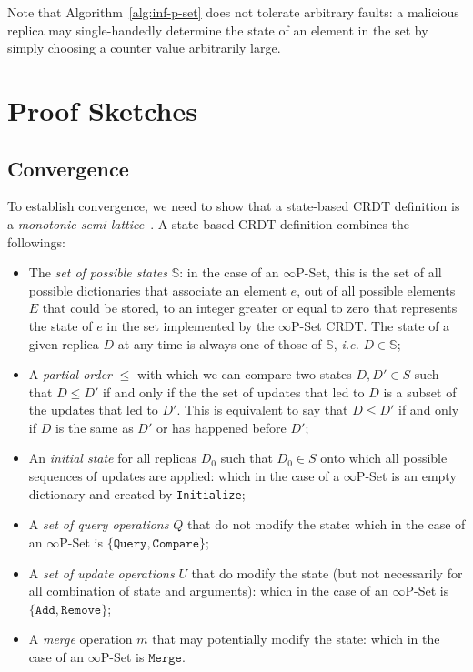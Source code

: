 \documentclass[11pt, oneside]{article}   	%
\begin{document}
Note that Algorithm~\ref{alg:inf-p-set} does not tolerate arbitrary faults: a malicious replica may single-handedly determine the state of an element in the set by simply choosing a counter value arbitrarily large.

\section{Proof Sketches}
\label{sec:proofs}

\subsection{Convergence}
\label{sec:proofs:convergence}

To establish convergence, we need to show that a state-based CRDT definition is a \textit{monotonic semi-lattice}~\cite{shapiro:hal-00932836}. A state-based CRDT definition combines the followings:
\begin{itemize}
	\item The \textit{set of possible states} $\mathds{S}$: in the case of an $\infty$P-Set, this is the set of all possible dictionaries that associate an element $e$, out of all possible elements $E$ that could be stored, to an integer greater or equal to zero that represents the state of $e$ in the set implemented by the $\infty$P-Set CRDT. The state of a given replica $D$ at any time is always one of those of $\mathds{S}$, \textit{i.e.} $D \in \mathds{S}$;
	\item A \textit{partial order} $\leq$ with which we can compare two states $D, D' \in S$ such that $D \leq D'$ if and only if the the set of updates that led to $D$ is a subset of the updates that led to $D'$. This is equivalent to say that $D \leq D'$ if and only if $D$ is the same as $D'$ or has happened before $D'$;
	\item An \textit{initial state} for all replicas $D_0$ such that $D_0 \in S$ onto which all possible sequences of updates are applied: which in the case of a $\infty$P-Set is an empty dictionary and created by \texttt{Initialize};
	\item A \textit{set of query operations} $Q$ that do not modify the state: which in the case of an $\infty$P-Set is $\{ \texttt{Query}, \texttt{Compare} \}$;
	\item A \textit{set of update operations} $U$ that do modify the state (but not necessarily for all combination of state and arguments): which in the case of an $\infty$P-Set is $\{ \texttt{Add}, \texttt{Remove} \}$;
	\item A \textit{merge} operation $m$ that may potentially modify the state: which in the case of an $\infty$P-Set is ${ \texttt{Merge} }$.
\end{itemize}
\end{document}

